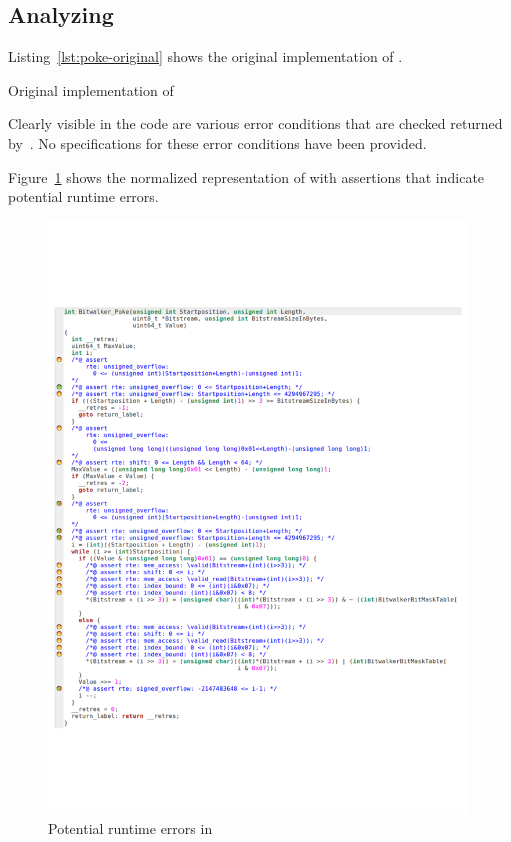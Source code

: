 \clearpage

\subsection{Analyzing \poke}

Listing~\ref{lst:poke-original} shows the original implementation of \poke.

\begin{listing}[hbt]
\begin{minipage}{\textwidth}

\end{minipage}
\caption{\label{lst:poke-original} Original implementation of \poke}
\end{listing}

Clearly visible in the code are various error conditions that are checked 
returned by~\poke.
No specifications for these error conditions have been provided.
 
\clearpage


Figure~\ref{fig:poke-wp} shows the normalized representation of \poke
with \acsl assertions that indicate potential runtime errors.

\begin{figure}[hbt]
\begin{center}
\includegraphics[width=0.99\textwidth]{figures/poke-wp.pdf}
\caption{\label{fig:poke-wp} Potential runtime errors in \peek}
\end{center}
\end{figure}

